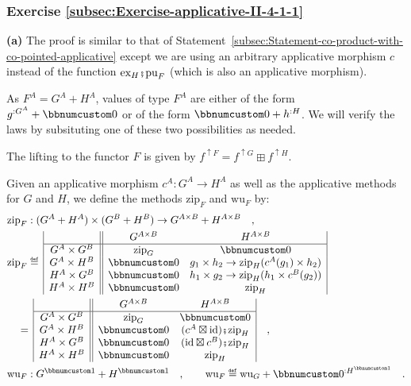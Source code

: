 \subsubsection*{Exercise \ref{subsec:Exercise-applicative-II-4-1-1}}

\textbf{(a)} The proof is similar to that of Statement~\ref{subsec:Statement-co-product-with-co-pointed-applicative}
except we are using an arbitrary applicative morphism $c$ instead
of the function $\text{ex}_{H}\bef\text{pu}_{F}$ (which is also an
applicative morphism).

As $F^{A}=G^{A}+H^{A}$, values of type $F^{A}$ are either of the
form $g^{:G^{A}}+\bbnum 0$ or of the form $\bbnum 0+h^{:H}$. We
will verify the laws by subsituting one of these two possibilities
as needed.

The lifting to the functor $F$ is given by $f^{\uparrow F}=f^{\uparrow G}\boxplus f^{\uparrow H}$.

Given an applicative morphism $c^{A}:G^{A}\rightarrow H^{A}$ as well
as the applicative methods for $G$ and $H$, we define the methods
$\text{zip}_{F}$ and $\text{wu}_{F}$ by:
\begin{align*}
 & \text{zip}_{F}:(G^{A}+H^{A})\times(G^{B}+H^{B})\rightarrow G^{A\times B}+H^{A\times B}\quad,\\
 & \text{zip}_{F}\triangleq\,\begin{array}{|c||cc|}
 & G^{A\times B} & H^{A\times B}\\
\hline G^{A}\times G^{B} & \text{zip}_{G} & \bbnum 0\\
G^{A}\times H^{B} & \bbnum 0 & g_{1}\times h_{2}\rightarrow\text{zip}_{H}(c^{A}(g_{1})\times h_{2})\\
H^{A}\times G^{B} & \bbnum 0 & h_{1}\times g_{2}\rightarrow\text{zip}_{H}(h_{1}\times c^{B}(g_{2}))\\
H^{A}\times H^{B} & \bbnum 0 & \text{zip}_{H}
\end{array}\\
 & \quad=\,\begin{array}{|c||cc|}
 & G^{A\times B} & H^{A\times B}\\
\hline G^{A}\times G^{B} & \text{zip}_{G} & \bbnum 0\\
G^{A}\times H^{B} & \bbnum 0 & (c^{A}\boxtimes\text{id})\bef\text{zip}_{H}\\
H^{A}\times G^{B} & \bbnum 0 & (\text{id}\boxtimes c^{B})\bef\text{zip}_{H}\\
H^{A}\times H^{B} & \bbnum 0 & \text{zip}_{H}
\end{array}\quad,\\
 & \text{wu}_{F}:G^{\bbnum 1}+H^{\bbnum 1}\quad,\quad\quad\text{wu}_{F}\triangleq\text{wu}_{G}+\bbnum 0^{:H^{\bbnum 1}}\quad.
\end{align*}

